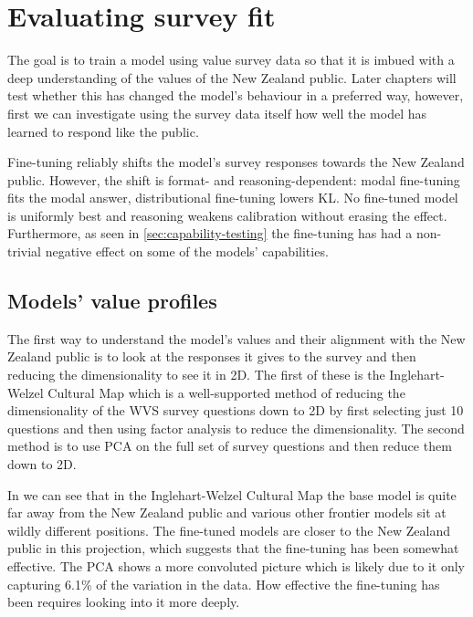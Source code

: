 \section{Evaluating survey fit}

The goal is to train a model using value survey data so that it is imbued with a deep understanding of the values of the New Zealand public. Later chapters will test whether this has changed the model's behaviour in a preferred way, however, first we can investigate using the survey data itself how well the model has learned to respond like the public.

Fine-tuning reliably shifts the model's survey responses towards the New Zealand public. However, the shift is format- and reasoning-dependent: modal fine-tuning fits the modal answer, distributional fine-tuning lowers KL. No fine-tuned model is uniformly best and reasoning weakens calibration without erasing the effect. Furthermore, as seen in \ref{sec:capability-testing} the fine-tuning has had a non-trivial negative effect on some of the models' capabilities.

\subsection{Models' value profiles}

The first way to understand the model's values and their alignment with the New Zealand public is to look at the responses it gives to the survey and then reducing the dimensionality to see it in 2D. The first of these is the Inglehart-Welzel Cultural Map \cite{WVSMAP} which is a well-supported method of reducing the dimensionality of the WVS survey questions down to 2D by first selecting just 10 questions and then using factor analysis to reduce the dimensionality. The second method is to use PCA on the full set of survey questions and then reduce them down to 2D.


In  we can see that in the Inglehart-Welzel Cultural Map the base model is quite far away from the New Zealand public and various other frontier models sit at wildly different positions. The fine-tuned models are closer to the New Zealand public in this projection, which suggests that the fine-tuning has been somewhat effective. The PCA shows a more convoluted picture which is likely due to it only capturing 6.1\% of the variation in the data. How effective the fine-tuning has been requires looking into it more deeply.


